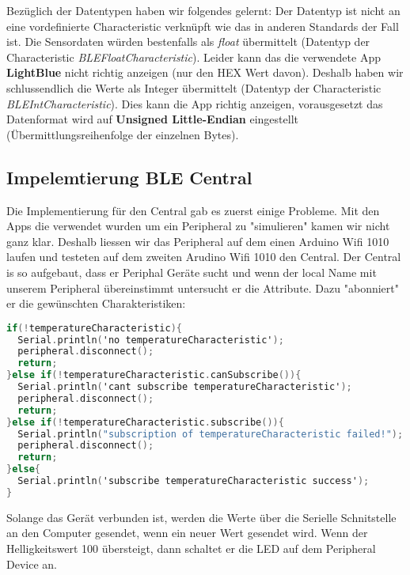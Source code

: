\documentclass{article}
\begin{document}
Bezüglich der Datentypen haben wir folgendes gelernt: Der Datentyp ist nicht an eine vordefinierte Characteristic verknüpft wie das in anderen Standards der Fall ist. Die Sensordaten würden bestenfalls als \textit{float} übermittelt (Datentyp der Characteristic \textit{BLEFloatCharacteristic}). Leider kann das die verwendete App \textbf{LightBlue} nicht richtig anzeigen (nur den HEX Wert davon). Deshalb haben wir schlussendlich die Werte als Integer übermittelt (Datentyp der Characteristic \textit{BLEIntCharacteristic}).
Dies kann die App richtig anzeigen, vorausgesetzt das Datenformat wird auf \textbf{Unsigned Little-Endian} eingestellt (Übermittlungsreihenfolge der einzelnen Bytes).

\subsection{Impelemtierung BLE Central  }
Die Implementierung für den Central gab es zuerst einige Probleme. Mit den Apps die verwendet wurden um ein Peripheral zu "simulieren" kamen wir nicht ganz klar. Deshalb liessen wir das Peripheral auf dem einen Arduino Wifi 1010 laufen und testeten auf dem zweiten Arudino Wifi 1010 den Central. \newline
Der Central is so aufgebaut, dass er Periphal Geräte sucht und wenn der local Name mit unserem Peripheral übereinstimmt untersucht er die Attribute. Dazu "abonniert" er die gewünschten Charakteristiken:
\begin{lstlisting}[style=CStyle, language=C, caption=Abonnieren der Charakteristiken (Temp)]
if(!temperatureCharacteristic){
  Serial.println('no temperatureCharacteristic');
  peripheral.disconnect();
  return;
}else if(!temperatureCharacteristic.canSubscribe()){
  Serial.println('cant subscribe temperatureCharacteristic');
  peripheral.disconnect();
  return;            
}else if(!temperatureCharacteristic.subscribe()){
  Serial.println("subscription of temperatureCharacteristic failed!");
  peripheral.disconnect();
  return;
}else{
  Serial.println('subscribe temperatureCharacteristic success');
}
\end{lstlisting}
Solange das Gerät verbunden ist, werden die Werte über die Serielle Schnitstelle an den Computer gesendet, wenn ein neuer Wert gesendet wird. Wenn der Helligkeitswert 100 übersteigt, dann schaltet er die LED auf dem Peripheral Device an.
\end{document}
